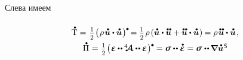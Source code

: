 \begin{otherlanguage}{russian}
\vspace{-0.2em} Слева имеем

\nopagebreak\vspace{-0.4em}\begin{equation*}\begin{array}{c}
\mathdotabove{\mathrm{T}} =^{\displaystyle \mathstrut^{\displaystyle \mathstrut}} \smalldisplaystyleonehalf \hspace{-0.25ex} \left( \hspace{.15ex} \rho \hspace{.2ex} \mathdotabove{\bm{u}} \dotp^{\mathstrut} \hspace{-0.16ex} \mathdotabove{\bm{u}} \hspace{.15ex} \right)^{\tikz[baseline=-0.2ex] \draw[black, fill=black] (0,0) circle (.28ex);} \hspace{-0.25ex}
= \smalldisplaystyleonehalf \hspace{.2ex} \rho \hspace{-0.1ex} \left( \mathdotabove{\bm{u}} \dotp \mathdotdotabove{\bm{u}} + \mathdotdotabove{\bm{u}} \dotp \mathdotabove{\bm{u}} \hspace{.1ex} \right)
\hspace{-0.12ex} =
\rho \hspace{.2ex} \mathdotdotabove{\bm{u}} \dotp \mathdotabove{\bm{u}}
\hspace{.2ex} ,
\\[.5em]
%
\mathdotabove{\Pi} \hspace{.1ex} = \hspace{.1ex} \smash{\smalldisplaystyleonehalf} \hspace{-0.25ex} \tikzmark{beginDerivativeOfElasticPotential} \left( \hspace{.1ex} \mathboldepsilon \hspace{-0.1ex} \dotdotp \hspace{-0.1ex} \stiffnesstensor \dotdotp \mathboldepsilon \hspace{.1ex} \right)^{\tikz[baseline=-0.2ex] \draw[black, fill=black] (0,0) circle (.28ex);} \hspace{-1.2ex} \tikzmark{endDerivativeOfElasticPotential} \hspace{.8ex}
= \linearstress \dotdotp \mathdotabove{\mathboldepsilon}
= \linearstress \hspace{.1ex} \dotdotp \hspace{-0.12ex} \boldnabla \mathdotabove{\bm{u}}^{\hspace{.1ex}\mathsf{S}} \hspace{-0.12ex}

\end{array}
\end{equation*}
\end{otherlanguage}
